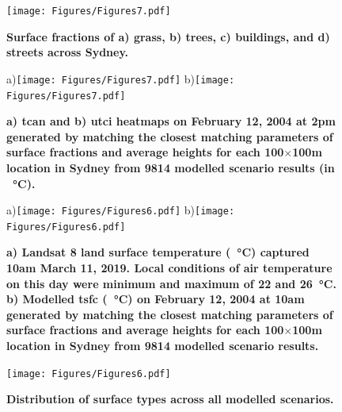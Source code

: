 \documentclass[final,3p,times,authoryear]{elsarticle}
\begin{document}
\begin{figure}
\centering
\texttt{[image: Figures/Figures7.pdf]}
\caption{\bf Surface fractions of a) grass, b) trees, c) buildings, and d) streets across Sydney.}
 \label{fig:sydfracs}
\end{figure}

\begin{figure}
\centering
a)\texttt{[image: Figures/Figures7.pdf]}
b)\texttt{[image: Figures/Figures7.pdf]}
\caption{\bf a) \gls{tcan} and b) \gls{utci} heatmaps on February 12, 2004 at 2pm generated by matching the closest matching parameters of surface fractions and average heights for each 100$\times$100m location in Sydney from 9814 modelled scenario results (in \SI{}{\degreeCelsius}).  }
 \label{fig:TaSyd} \label{fig:utciSyd}
\end{figure}

\begin{figure} 
\centering
a)\texttt{[image: Figures/Figures6.pdf]}
b)\texttt{[image: Figures/Figures6.pdf]}
\caption{\bf a) Landsat 8 land surface temperature (\SI{}{\degreeCelsius}) captured 10am March 11, 2019. Local conditions of air temperature on this day were minimum and maximum of 22 and 26\SI{}{\degreeCelsius}. b) Modelled \gls{tsfc} (\SI{}{\degreeCelsius}) on February 12, 2004 at 10am generated by matching the closest matching parameters of surface fractions and average heights for each 100$\times$100m location in Sydney from 9814 modelled scenario results.}
 \label{fig:Sydney-Landsat-LST-11-03-2019}
 \label{fig:Sydney_TSFC12_85}
\end{figure}


\begin{figure}
\centering
\texttt{[image: Figures/Figures6.pdf]}
\caption{\bf Distribution of surface types across all modelled scenarios.}
 \label{fig:surfdist}
\end{figure}
\end{document}
